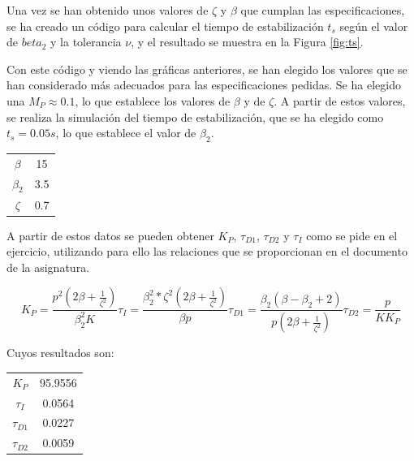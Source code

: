 \documentclass[a4paper]{article}
\begin{document}
Una vez se han obtenido unos valores de $\zeta$ y $\beta$ que cumplan las especificaciones, se ha creado un código para calcular el tiempo de estabilización $t_s$ según el valor de $beta_2$ y la tolerancia $\nu$, y el resultado se muestra en la Figura \ref{fig:ts}.

Con este código y viendo las gráficas anteriores, se han elegido los valores que se han considerado más adecuados para las especificaciones pedidas. Se ha elegido una $M_P \approx 0.1$, lo que establece los valores de $\beta$ y de $\zeta$. A partir de estos valores, se realiza la simulación del tiempo de estabilización, que se ha elegido como $t_s = 0.05 s$, lo que establece el valor de $\beta_2$.

\begin{center}
	\begin{tabular}{c|c}
			$\beta$ & 15 \\
			$\beta_2$ & 3.5 \\
			$\zeta$ & 0.7 \\
	\end{tabular}
\end{center}

A partir de estos datos se pueden obtener $K_P$, $\tau_{D1}$, $\tau_{D2}$ y $\tau_I$ como se pide en el ejercicio, utilizando para ello las relaciones que se proporcionan en el documento de la asignatura.

\begin{subequations}
	\begin{equation}
		K_P=\frac{p^2(2\beta+\frac{1}{\zeta^2})}{\beta_2^2 K}
	\end{equation}
	\begin{equation}
		\tau_I=\frac{\beta_2^2*\zeta^2(2\beta + \frac{1}{\zeta^2})}{\beta p}
	\end{equation}
	\begin{equation}
		\tau_{D1}=\frac{\beta_2(\beta-\beta_2+2)}{p(2\beta + \frac{1}{\zeta^2})}
	\end{equation}
	\begin{equation}
		\tau_{D2}=\frac{p}{K K_P}
	\end{equation}
\end{subequations}

Cuyos resultados son:
\begin{center}
	\begin{tabular}{c|c}
		$K_P$ & 95.9556 \\
		$\tau_I$ & 0.0564 \\
		$\tau_{D1}$ & 0.0227 \\
		$\tau_{D2}$ & 0.0059 \\
	\end{tabular}
\end{center}
\end{document}
